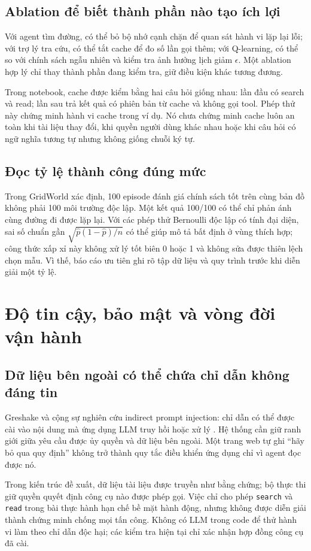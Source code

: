 \subsection{Ablation để biết thành phần nào tạo ích lợi}
Với agent tìm đường, có thể bỏ bộ nhớ cạnh chặn để quan sát hành vi lặp lại lỗi; với
trợ lý tra cứu, có thể tắt cache để đo số lần gọi thêm; với Q-learning, có thể so với
chính sách ngẫu nhiên và kiểm tra ảnh hưởng lịch giảm $\epsilon$. Một ablation hợp
lý chỉ thay thành phần đang kiểm tra, giữ điều kiện khác tương đương.

Trong notebook, cache được kiểm bằng hai câu hỏi giống nhau: lần đầu có search và
read; lần sau trả kết quả có phiên bản từ cache và không gọi tool. Phép thử này chứng
minh hành vi cache trong ví dụ. Nó chưa chứng minh cache luôn an toàn khi tài liệu
thay đổi, khi quyền người dùng khác nhau hoặc khi câu hỏi có ngữ nghĩa tương tự nhưng
không giống chuỗi ký tự.

\subsection{Đọc tỷ lệ thành công đúng mức}
Trong GridWorld xác định, 100 episode đánh giá chính sách tốt trên cùng bản đồ không
phải 100 môi trường độc lập. Một kết quả 100/100 có thể chỉ phản ánh cùng đường đi
được lặp lại. Với các phép thử Bernoulli độc lập có tính đại diện, sai số chuẩn gần
$\sqrt{\hat p(1-\hat p)/n}$ có thể giúp mô tả bất định ở vùng thích hợp; công thức
xấp xỉ này không xử lý tốt biên 0 hoặc 1 và không sửa được thiên lệch chọn mẫu.
Vì thế, báo cáo ưu tiên ghi rõ tập dữ liệu và quy trình trước khi diễn giải một tỷ lệ.

\par
\section{Độ tin cậy, bảo mật và vòng đời vận hành}
\subsection{Dữ liệu bên ngoài có thể chứa chỉ dẫn không đáng tin}
Greshake và cộng sự nghiên cứu indirect prompt injection: chỉ dẫn có thể được cài vào
nội dung mà ứng dụng LLM truy hồi hoặc xử lý \cite{injection}. Hệ thống cần giữ ranh
giới giữa yêu cầu được ủy quyền và dữ liệu bên ngoài. Một trang web tự ghi ``hãy bỏ
qua quy định'' không trở thành quy tắc điều khiển ứng dụng chỉ vì agent đọc được nó.

Trong kiến trúc đề xuất, dữ liệu tài liệu được truyền như bằng chứng; bộ thực thi giữ
quyền quyết định công cụ nào được phép gọi. Việc chỉ cho phép \texttt{search} và
\texttt{read} trong bài thực hành hạn chế bề mặt hành động, nhưng không được diễn giải
thành chứng minh chống mọi tấn công. Không có LLM trong code để thử hành vi làm theo
chỉ dẫn độc hại; các kiểm tra hiện tại chỉ xác nhận hợp đồng công cụ đã cài.

